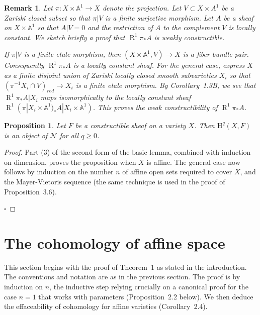 \documentclass[10pt,twoside]{article}
\newtheorem{prop}[thm]{Proposition}
\newcommand{\homology}{{\mathrm {H}}}
\newcommand{\A}{{\mathbb {A}}}
\newcommand{\derived}{{\operatorname{R}}}
\newcommand{\qed}{\nopagebreak\par\hspace*{\fill}$\square$\par\vskip2mm}
\newtheorem{proof}{Proof}
\newtheorem{remark}[thm]{Remark}
\begin{document}
\begin{remark}
Let $\pi: X \times \A^1 \to X$ denote
the projection. Let $V\subset X \times A^1$
be a Zariski closed subset so that $\pi|V$ is a finite 
surjective morphism. Let $A$ be a sheaf on $X \times \A^1$ so 
that $A|V=0$ and the restriction of $A$ to the complement
$V$ is locally constant. We sketch briefly a proof that 
$\derived^1\pi_*A$ is weakly constructible.

If $\pi |V$ is a finite etale morphism, then $(X \times \A^1,V)
\to X$ is a fiber bundle pair. Consequently 
$\derived^1\pi_*A$ is a locally constant sheaf. 
For the general case,
express  
$X$ as a finite disjoint union of Zariski locally closed smooth
subvarieties $X_i$ so that $(\pi ^{-1}X_i \cap V)_{red} \to X_i$ 
is a finite etale morphism. By Corollary~1.3B, we see
that $\derived ^1 \pi _* A|X_i$ maps isomorphically 
to the locally constant sheaf 
$\derived ^1 (\pi |X_i \times \A^1 )_*A|X_i \times \A^1)$. 
This proves the weak constructibility of $\derived^1\pi_*A$.
\end{remark}


\begin{prop}Let $F$ be a 
constructible sheaf on a variety $X$. Then $\homology
^q(X,F)$ is an object of $\mathcal{N}$ for all $q \geq 0$.
\end{prop}

\begin{proof} Part (3) of the second form of the basic
lemma, combined with induction on dimension, proves the 
proposition when $X$ is affine. The general case now
follows  by induction on the number $n$ of affine open sets
 required to cover $X$, and the Mayer-Vietoris sequence (the
 same technique is used in the proof of Proposition~3.6).
\qed\end{proof}

\section{The cohomology of affine space} 

This section begins with the proof of Theorem~1
as stated in the introduction. The conventions and notation
are as in the previous section. The proof is
by induction on $n$, the inductive step relying crucially 
 on a  canonical proof for the case 
$n=1$ that works with parameters (Proposition~2.2 below). We
then deduce the effaceability of cohomology for affine varieties
(Corollary~2.4).
\end{document}
